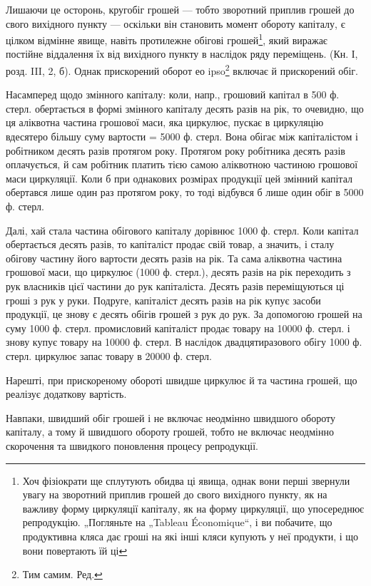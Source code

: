 Лишаючи це осторонь, кругобіг грошей — тобто зворотний приплив
грошей до свого вихідного пункту — оскільки він становить момент
обороту капіталу, є цілком відмінне явище, навіть протилежне обігові
грошей\footnote{
Хоч фізіократи ще сплутують обидва ці явища, однак вони перші звернули
увагу на зворотний приплив грошей до свого вихідного пункту, як на важливу
форму циркуляції капіталу, як на форму циркуляції, що упосереднює репродукцію.
„Погляньте на „Tableau Économique“, і ви побачите, що продуктивна кляса дає
гроші на які інші кляси купують у неї продукти, і що вони повертають їй ці
}, який виражає постійне віддалення їх від вихідного
пункту в наслідок ряду переміщень. (Кн. І, розд. III, 2, б). Однак прискорений
оборот ео ipso\footnote*{
Тим самим. Ред.
} включає й прискорений обіг.

Насамперед щодо змінного капіталу: коли, напр., грошовий капітал
в 500 ф. стерл. обертається в формі змінного капіталу десять разів на
рік, то очевидно, що ця аліквотна частина грошової маси, яка циркулює,
пускає в циркуляцію вдесятеро більшу суму вартости = 5000 ф. стерл.
Вона обігає між капіталістом і робітником десять разів протягом року.
Протягом року робітника десять разів оплачується, й сам робітник платить
тією самою аліквотною частиною грошової маси циркуляції. Коли
б при однакових розмірах продукції цей змінний капітал обертався
лише один раз протягом року, то тоді відбувся б лише один обіг
в 5000 ф. стерл.

Далі, хай стала частина обігового капіталу дорівнює 1000 ф. стерл.
Коли капітал обертається десять разів, то капіталіст продає свій товар, а
значить, і сталу обігову частину його вартости десять разів на рік. Та
сама аліквотна частина грошової маси, що циркулює (1000 ф. стерл.),
десять разів на рік переходить з рук власників цієї частини до рук капіталіста.
Десять разів переміщуються ці гроші з рук у руки. Подруге,
капіталіст десять разів на рік купує засоби продукції, це знову є десять
обігів грошей з рук до рук. За допомогою грошей на суму 1000 ф. стерл.
промисловий капіталіст продає товару на 10000 ф. стерл. і знову купує
товару на 10000 ф. стерл. В наслідок двадцятиразового обігу 1000 ф. стерл.
циркулює запас товару в 20000 ф. стерл.

Нарешті, при прискореному обороті швидше циркулює й та частина
грошей, що реалізує додаткову вартість.

Навпаки, швидший обіг грошей і не включає неодмінно швидшого обороту
капіталу, а тому й швидшого обороту грошей, тобто не включає
неодмінно скорочення та швидкого поновлення процесу репродукції.

